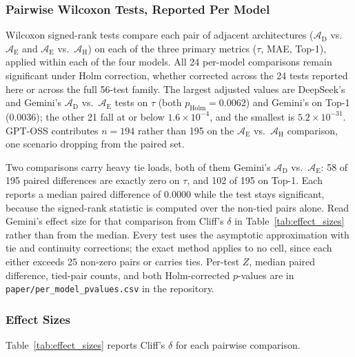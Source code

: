\documentclass[11pt]{article}
\begin{document}
\subsubsection{Pairwise Wilcoxon Tests, Reported Per Model}

Wilcoxon signed-rank tests compare each pair of adjacent architectures ($\mathcal{A}_{\text{D}}$ vs.\ $\mathcal{A}_{\text{E}}$ and $\mathcal{A}_{\text{E}}$ vs.\ $\mathcal{A}_{\text{H}}$) on each of the three primary metrics ($\tau$, MAE, Top-1), applied within each of the four models. All 24 per-model comparisons remain significant under Holm correction, whether corrected across the 24 tests reported here or across the full 56-test family. The largest adjusted values are DeepSeek's and Gemini's $\mathcal{A}_{\text{D}}$ vs.\ $\mathcal{A}_{\text{E}}$ tests on $\tau$ (both $p_{\mathrm{Holm}} = 0.0062$) and Gemini's on Top-1 ($0.0036$); the other 21 fall at or below $1.6 \times 10^{-4}$, and the smallest is $5.2 \times 10^{-31}$. GPT-OSS contributes $n = 194$ rather than 195 on the $\mathcal{A}_{\text{E}}$ vs.\ $\mathcal{A}_{\text{H}}$ comparison, one scenario dropping from the paired set.

Two comparisons carry heavy tie loads, both of them Gemini's $\mathcal{A}_{\text{D}}$ vs.\ $\mathcal{A}_{\text{E}}$: 58 of 195 paired differences are exactly zero on $\tau$, and 102 of 195 on Top-1. Each reports a median paired difference of 0.0000 while the test stays significant, because the signed-rank statistic is computed over the non-tied pairs alone. Read Gemini's effect size for that comparison from Cliff's $\delta$ in Table~\ref{tab:effect_sizes} rather than from the median. Every test uses the asymptotic approximation with tie and continuity corrections; the exact method applies to no cell, since each either exceeds 25 non-zero pairs or carries ties. Per-test $Z$, median paired difference, tied-pair counts, and both Holm-corrected $p$-values are in \texttt{paper/per\_model\_pvalues.csv} in the repository.

\subsubsection{Effect Sizes}

Table~\ref{tab:effect_sizes} reports Cliff's $\delta$ for each pairwise comparison.
\end{document}
